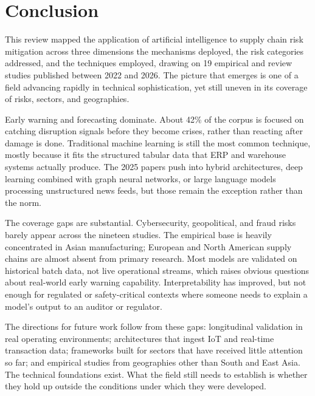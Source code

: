 \section{Conclusion}

This review mapped the application of artificial intelligence to supply 
chain risk mitigation across three dimensions the mechanisms deployed, 
the risk categories addressed, and the techniques employed, drawing on 
19 empirical and review studies published between 2022 and 2026. 
The picture that emerges is one of a field advancing rapidly in 
technical sophistication, yet still uneven in its coverage of risks,
 sectors, and geographies.
 
Early warning and forecasting dominate. About 42\% of the corpus is
focused on catching disruption signals before they become crises, rather
than reacting after damage is done. Traditional machine learning is still
the most common technique, mostly because it fits the structured tabular
data that ERP and warehouse systems actually produce. The 2025 papers push
into hybrid architectures, deep learning combined with graph neural
networks, or large language models processing unstructured news
feeds, but those remain the exception rather than the norm.
 
The coverage gaps are substantial. Cybersecurity, geopolitical, and fraud
risks barely appear across the nineteen studies. The empirical base is
heavily concentrated in Asian manufacturing; European and North American
supply chains are almost absent from primary research. Most models are
validated on historical batch data, not live operational streams, which
raises obvious questions about real-world early warning capability.
Interpretability has improved, but not enough for
regulated or safety-critical contexts where someone needs to explain a
model's output to an auditor or regulator.
 
The directions for future work follow from these gaps: longitudinal
validation in real operating environments; architectures that ingest IoT
and real-time transaction data; frameworks built for sectors that have
received little attention so far; and empirical studies from geographies
other than South and East Asia. The technical foundations exist. What the
field still needs to establish is whether they hold up outside the
conditions under which they were developed.